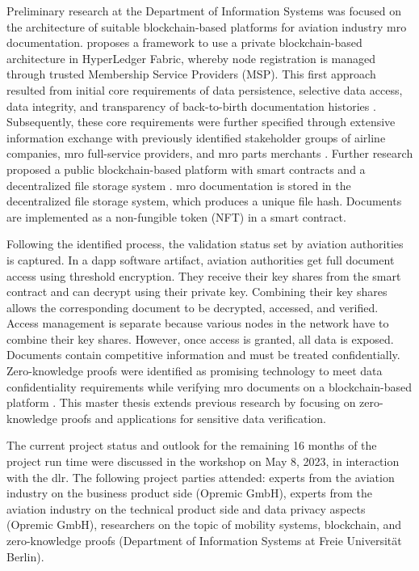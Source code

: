 Preliminary research at the Department of Information Systems was focused on the architecture of suitable blockchain-based platforms for aviation industry \acrshort{mro} documentation. \citet{WickboldtMeiseKliewer} proposes a framework to use a private blockchain-based architecture in HyperLedger Fabric, whereby node registration is managed through trusted Membership Service Providers (MSP). This first approach resulted from initial core requirements of data persistence, selective data access, data integrity, and transparency of back-to-birth documentation histories \citep{WickboldtClemens2018BzdD}. Subsequently, these core requirements were further specified through extensive information exchange with previously identified stakeholder groups of airline companies, \acrshort{mro} full-service providers, and \acrshort{mro} parts merchants \citep{ZedelJ}. Further research proposed a public blockchain-based platform with smart contracts and a decentralized file storage system \citep{ZedelJ}. \acrshort{mro} documentation is stored in the decentralized file storage system, which produces a unique file hash. Documents are implemented as a non-fungible token (NFT) in a smart contract.

Following the identified process, the validation status set by aviation authorities is captured. In a \acrshort{dapp} software artifact, aviation authorities get full document access using threshold encryption. They receive their key shares from the smart contract and can decrypt using their private key. Combining their key shares allows the corresponding document to be decrypted, accessed, and verified. Access management is separate because various nodes in the network have to combine their key shares. However, once access is granted, all data is exposed. Documents contain competitive information and must be treated confidentially. Zero-knowledge proofs were identified as promising technology to meet data confidentiality requirements while verifying \acrshort{mro} documents on a blockchain-based platform \citep{ZedelJ}. This master thesis extends previous research by focusing on zero-knowledge proofs and applications for sensitive data verification.

The current project status and outlook for the remaining 16 months of the project run time were discussed in the workshop on May 8, 2023, in interaction with the \acrshort{dlr}. The following project parties attended: experts from the aviation industry on the business product side (Opremic GmbH), experts from the aviation industry on the technical product side and data privacy aspects (Opremic GmbH), researchers on the topic of mobility systems, blockchain, and zero-knowledge proofs (Department of Information Systems at Freie Universit{\"a}t Berlin). 

